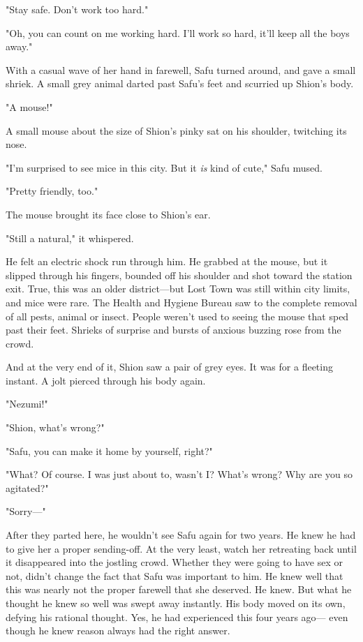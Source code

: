 "Stay safe. Don't work too hard."

"Oh, you can count on me working hard. I'll work so hard, it'll keep all
the boys away."

With a casual wave of her hand in farewell, Safu turned around, and gave
a small shriek. A small grey animal darted past Safu's feet and scurried
up Shion's body.

"A mouse!"

A small mouse about the size of Shion's pinky sat on his shoulder,
twitching its nose.

"I'm surprised to see mice in this city. But it \emph{is} kind of cute," Safu
mused.

"Pretty friendly, too."

The mouse brought its face close to Shion's ear.

"Still a natural," it whispered.

He felt an electric shock run through him. He grabbed at the mouse, but
it slipped through his fingers, bounded off his shoulder and shot toward
the station exit. True, this was an older district---but Lost Town was
still within city limits, and mice were rare. The Health and Hygiene
Bureau saw to the complete removal of all pests, animal or insect.
People weren't used to seeing the mouse that sped past their feet.
Shrieks of surprise and bursts of anxious buzzing rose from the crowd.

And at the very end of it, Shion saw a pair of grey eyes. It was for a
fleeting instant. A jolt pierced through his body again.

"Nezumi!"

"Shion, what's wrong?"

"Safu, you can make it home by yourself, right?"

"What? Of course. I was just about to, wasn't I? What's wrong? Why are
you so agitated?"

"Sorry---"

After they parted here, he wouldn't see Safu again for two years. He
knew he had to give her a proper sending-off. At the very least, watch
her retreating back until it disappeared into the jostling crowd.
Whether they were going to have sex or not, didn't change the fact that
Safu was important to him. He knew well that this was nearly not the
proper farewell that she deserved. He knew. But what he thought he knew
so well was swept away instantly. His body moved on its own, defying his
rational thought. Yes, he had experienced this four years ago--- even
though he knew reason always had the right answer.

